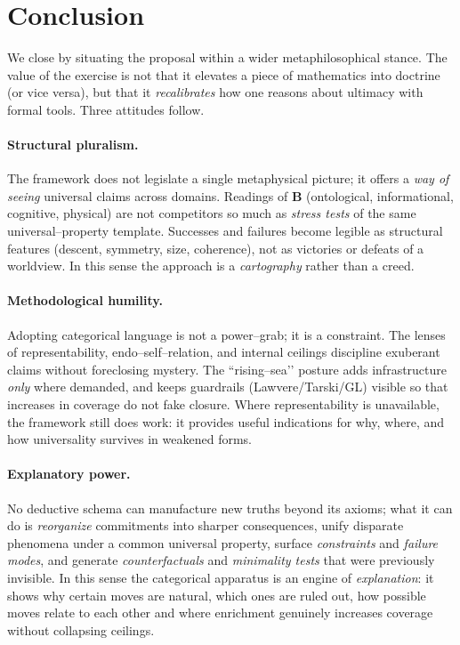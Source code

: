 \documentclass[11pt]{article}
\theoremstyle{upright}
\begin{document}
\section{Conclusion}\label{sec:concl}
We close by situating the proposal within a wider metaphilosophical stance. The value of the exercise is not that it elevates a piece of mathematics into doctrine (or vice versa), but that it \emph{recalibrates} how one reasons about ultimacy with formal tools. Three attitudes follow.

\paragraph{Structural pluralism.}
The framework does not legislate a single metaphysical picture; it offers a \emph{way of seeing} universal claims across domains. Readings of $\mathbf B$ (ontological, informational, cognitive, physical) are not competitors so much as \emph{stress tests} of the same universal–property template. Successes and failures become legible as structural features (descent, symmetry, size, coherence), not as victories or defeats of a worldview. In this sense the approach is a \emph{cartography} rather than a creed.

\paragraph{Methodological humility.}
Adopting categorical language is not a power–grab; it is a constraint. The lenses of representability, endo–self–relation, and internal ceilings discipline exuberant claims without foreclosing mystery. The “rising–sea’’ posture adds infrastructure \emph{only} where demanded, and keeps guardrails (Lawvere/Tarski/GL) visible so that increases in coverage do not fake closure. Where representability is unavailable, the framework still does work: it provides useful indications for why, where, and how universality survives in weakened forms.

\paragraph{Explanatory power.}
No deductive schema can manufacture new truths beyond its axioms; what it can do is \emph{reorganize} commitments into sharper consequences, unify disparate phenomena under a common universal property, surface \emph{constraints} and \emph{failure modes}, and generate \emph{counterfactuals} and \emph{minimality tests} that were previously invisible. In this sense the categorical apparatus is an engine of \emph{explanation}: it shows why certain moves are natural, which ones are ruled out, how possible moves relate to
each other and where enrichment genuinely increases coverage without collapsing ceilings.
\end{document}
